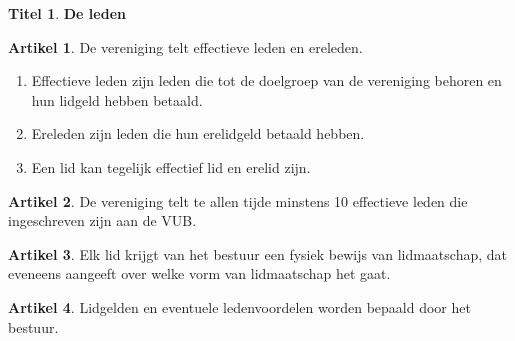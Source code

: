 \documentclass[a4paper,10pt]{article}
\theoremstyle{definition}
\newtheorem{titel}{\newline\Large Titel}
\newtheorem{artikel}{\large Artikel}
\newcommand{\ttext}[1]{\Large \textbf{#1} \normalsize}
\newcommand{\ttextcr}{\hfill\newline}
\begin{document}
\begin{titel}\ttext{De leden}

  \begin{artikel}\ttextcr
    De vereniging telt effectieve leden en ereleden.
    \begin{enumerate}
      \item
        Effectieve leden zijn leden die tot de doelgroep van de vereniging behoren en hun lidgeld hebben betaald.
      \item
        Ereleden zijn leden die hun erelidgeld betaald hebben.
      \item
        Een lid kan tegelijk effectief lid en erelid zijn.
    \end{enumerate}
  \end{artikel}

  \begin{artikel}\ttextcr
    De vereniging telt te allen tijde minstens 10 effectieve leden die ingeschreven zijn aan de VUB.
  \end{artikel}

  \begin{artikel}\ttextcr
    Elk lid krijgt van het bestuur een fysiek bewijs van lidmaatschap, dat eveneens aangeeft over welke vorm van lidmaatschap het gaat. %
  \end{artikel}

  \begin{artikel}\ttextcr
    Lidgelden en eventuele ledenvoordelen worden bepaald door het bestuur.
  \end{artikel}

\end{titel}

\end{document}
